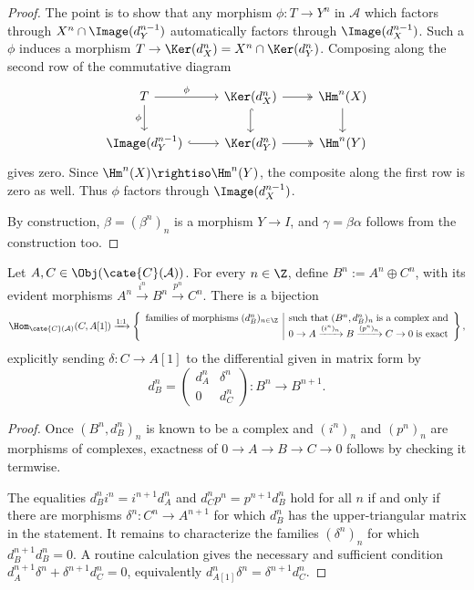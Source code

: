 \begin{proof}
	The point is to show that any morphism $\phi:T\to Y^n$ in $\mathcal{A}$
	which factors through $X^n\cap\Image(d_Y^{n-1})$ automatically factors
	through $\Image(d_X^{n-1})$. Such a $\phi$ induces a morphism
	$T\to\Ker(d_X^n)=X^n\cap\Ker(d_Y^n)$. Composing along the second row of
	the commutative diagram
	\[\begin{tikzcd}
		T \arrow[r, "\phi"] \arrow[d, "\phi"'] & \Ker(d_X^n) \arrow[twoheadrightarrow, r] \arrow[hookrightarrow, d] & \Hm^n(X) \arrow[d] \\
		\Image(d_Y^{n-1}) \arrow[hookrightarrow, r] & \Ker(d_Y^n) \arrow[twoheadrightarrow, r] & \Hm^n(Y)
	\end{tikzcd}\]
	gives zero. Since $\Hm^n(X)\rightiso\Hm^n(Y)$, the composite along the
	first row is zero as well. Thus $\phi$ factors through
	$\Image(d_X^{n-1})$.

	By construction, $\beta=(\beta^n)_n$ is a morphism $Y\to I$, and
	$\gamma=\beta\alpha$ follows from the construction too.
\end{proof}

\begin{lemma}\label{prop:split-differential}
	Let $A,C\in\Obj(\cate{C}(\mathcal{A}))$. For every $n\in\Z$, define
	$B^n:=A^n\oplus C^n$, with its evident morphisms
	$A^n\xrightarrow{i^n}B^n\xrightarrow{p^n}C^n$. There is a bijection
	\[ \Hom_{\cate{C}(\mathcal{A})}(C, A[1]) \xrightarrow{1:1} \left\{\begin{array}{r|l}
		\text{families of morphisms}\; (d_B^n)_{n \in \Z} & \text{such that}\; (B^n, d_B^n)_n \;\text{is a complex and}  \\
		& 0 \to A \xrightarrow{(i^n)_n} B \xrightarrow{(p^n)_n} C \to 0 \;\text{is exact}
	\end{array}\right\}, \]
	explicitly sending $\delta:C\to A[1]$ to the differential given in matrix
	form by
	\[ d_B^n = \begin{pmatrix}
		d_A^n & \delta^n \\
		0 & d_C^n
	\end{pmatrix}: B^n \to B^{n+1}. \]
\end{lemma}
\begin{proof}
	Once $(B^n,d_B^n)_n$ is known to be a complex and $(i^n)_n$ and $(p^n)_n$
	are morphisms of complexes, exactness of $0\to A\to B\to C\to0$ follows
	by checking it termwise.

	The equalities $d_B^ni^n=i^{n+1}d_A^n$ and
	$d_C^np^n=p^{n+1}d_B^n$ hold for all $n$ if and only if there are morphisms
	$\delta^n:C^n\to A^{n+1}$ for which $d_B^n$ has the upper-triangular matrix
	in the statement. It remains to characterize the families $(\delta^n)_n$
	for which $d_B^{n+1}d_B^n=0$. A routine calculation gives the necessary
	and sufficient condition
	$d_A^{n+1}\delta^n+\delta^{n+1}d_C^n=0$, equivalently
	$d_{A[1]}^n\delta^n=\delta^{n+1}d_C^n$.
\end{proof}

